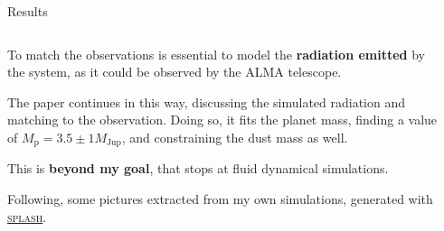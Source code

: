 \documentclass[9pt]{beamer}
\newcommand{\splash}{\textsc{splash}\xspace}
\begin{document}
\begin{frame}{Results}
    \begin{columns}
        \begin{column}{0.5\textwidth}
            To match the observations is essential to model the
            \textbf{radiation emitted} by the system, as it could be observed
            by the ALMA telescope.

            The paper continues in this way, discussing the simulated radiation
            and matching to the observation.
            Doing so, it fits the planet mass, finding a value of $M_\text{p} =
            3.5 \pm 1 M_\text{Jup}$, and constraining the dust mass as well.
            \vspace*{10pt}

            This is \textbf{beyond my goal}, that stops at fluid dynamical
            simulations.

            Following, some pictures extracted from my own simulations,
            generated with
            \href{https://users.monash.edu.au/~dprice/splash/}{\splash}.
        \end{column}
        \begin{column}{0.5\textwidth}
        \end{column}
    \end{columns}
\end{frame}
\end{document}
